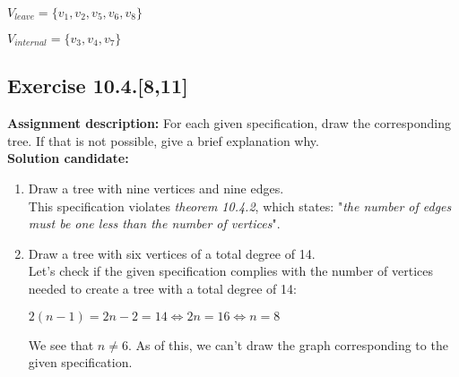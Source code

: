 \documentclass{report}
\newcommand{\cent}[1]{\begin{center}#1\end{center}}
\newcommand{\assignmentDescription}{\textbf{Assignment description: }}
\newcommand{\solution}{\textbf{Solution candidate: }}
\newcommand{\Exercise}[1]{\subsection{Exercise #1}}
\newcommand{\defaultEnumerateLabel}{\textbf{\alph*.}}
\newcommand{\myItem}[1]{\item #1\\}
\begin{document}
	\cent{$V_{leave} = \{v_1, v_2, v_5, v_6,v_8\}$}
	\cent{$V_{internal} = \{v_3,v_4,v_7\}$}
	
	\Exercise{10.4.[8,11]}
	
	\assignmentDescription
	For each given specification, draw the corresponding tree. If that is not possible, give a brief explanation why.\\
	
	\solution
	
	\begin{enumerate}[label=\defaultEnumerateLabel]
		\myItem{Draw a tree with nine vertices and nine edges.}
		
		This specification violates \textit{theorem 10.4.2}, which states: "\textit{the number of edges must be one less than the number of vertices}". 
		
		\myItem{Draw a tree with six vertices of a total degree of 14.}
		
		Let's check if the given specification complies with the number of vertices needed to create a tree with a total degree of 14:
		
		\cent{$ 2(n-1) = 2n -2 = 14  \Leftrightarrow  2n = 16 \Leftrightarrow n=8 $}
		
		We see that $n \neq 6$. As of this, we can't draw the graph corresponding to the given specification.
	\end{enumerate}
\end{document}
